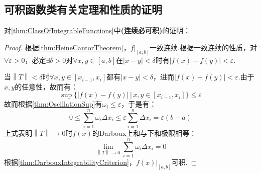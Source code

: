 \subsection{可积函数类有关定理和性质的证明}
\label{subsec:ProofsOfIntegrableFunctions}
对\cref{thm:ClassOfIntegrableFunctions}中\textbf{(连续必可积)}的证明：
\begin{proof}
    根据\cref{thm:HeineCantorTheorem}，$\left.f\right|_{[a,b]}$一致连续.根据一致连续的性质，对$\forall \varepsilon>0$，必定$\exists \delta>0$对$\forall x,y\in[a,b]$在$|x-y|<\delta$时有$|f(x)-f(y)|<\varepsilon$.

    当$\left\|T\right\|<\delta$时$\forall x,y\in[x_{i-1},x_i]$都有$|x-y|<\delta$，进而$|f(x)-f(y)|<\varepsilon$.由于$x,y$的任意性，故而有：
    \[\sup\{|f(x)-f(y)|\,|\,x,y\in[x_{i-1},x_i]\} \leqslant \varepsilon\]
    故而根据\cref{thm:OscillationSup}有$\omega_i \leqslant \varepsilon$，于是有：
    \[0 \leqslant \sum_{i=1}^{n}\omega_i\Delta x_i \leqslant \varepsilon \sum_{i=1}^{n}\Delta x_i = \varepsilon(b-a)\]
    上式表明$\left\|T\right\|\to 0$时$f(x)$的Darboux上和与下和极限相等：
    \[\lim_{\left\|T\right\| \to 0}\sum_{i=1}^{n}\omega_i\Delta x_i = 0\]
    根据\cref{thm:DarbouxIntegrabilityCriterion}，$\left.f(x)\right|_{[a,b]}$可积.
\end{proof}


